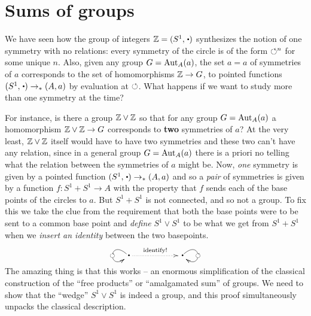 


\section{Sums of groups}
\label{sec:coprod}
We have seen how the group of integers $\ZZ=(S^1,\base)$ synthesizes the notion of one symmetry with no relations: every symmetry of the circle is of the form $\circlearrowleft^n$ for some unique $n$.  Also, given any group $G=\mathrm{Aut}_A(a)$, the set $a=a$ of symmetries of $a$ corresponds to the set of homomorphisms $\mathbb{Z}\to G$, \ie to pointed functions $(S^1,\base)\to_*(A,a)$ by evaluation at $\circlearrowleft$.  What happens if we want to study more than one symmetry at the time?  

For instance, is there a group $\ZZ\vee%
\ZZ$ so that for any group $G=\mathrm{Aut}_A(a)$ a homomorphism $\ZZ\vee%
\ZZ\to G$ corresponds to {\bf two} symmetries of $a$?  
At the very least, $\mathbb{Z}\vee\mathbb{Z}$ itself would have to have two symmetries and these two can't have any relation, since in a general group $G=\mathrm{Aut}_A(a)$ there is a priori no telling what the relation between the symmetries of $a$ might be.  
Now, \emph{one} symmetry is given by a pointed function $(S^1,\base)\to_*(A,a)$ and so a \emph{pair} of symmetries is given by a function $f:S^1+S^1\to A$ with the property that $f$ sends each of the base points of the circles to $a$.  But $S^1+S^1$ is not connected, and so not a group.  To fix this we take the clue from the requirement that both the base points were to be sent to a common base point and \emph{define} $S^1\vee S^1$ to be what we get from $S^1+S^1$ when we \emph{insert an identity} between the two basepoints.
$$\xymatrix{\base\ar@(ul,dl)[]|{\Sloop}\ar@{.>}[rr]^{\text{identify!}}&&\base\ar@(ur,dr)[]|{\Sloop}}
$$
The amazing thing is that this works -- an enormous simplification of the classical construction of the ``free products'' or ``amalgamated sum'' of groups.  We need to show that the ``wedge'' $S^1\vee S^1$ is indeed a group, and this proof simultaneously unpacks the classical description.


